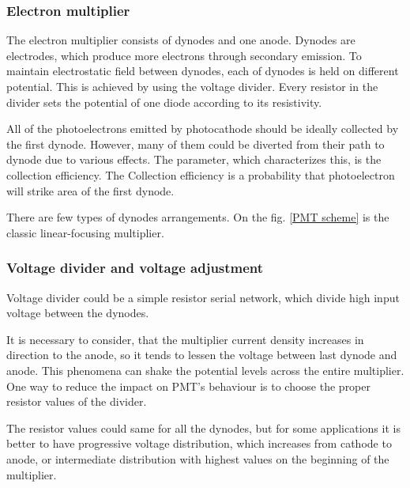 \subsubsection{Electron multiplier}
The electron multiplier consists of dynodes and one anode.
Dynodes are electrodes, which produce more electrons through secondary emission. To maintain electrostatic field between dynodes, each of dynodes is held on different potential. This is achieved by using the voltage divider. Every resistor in the divider sets the potential of one diode according to its resistivity.
\par
All of the photoelectrons emitted by photocathode should be ideally collected by the first dynode. However, many of them could be diverted from their path to dynode due to various effects. The parameter, which characterizes this, is the collection efficiency. The Collection efficiency is a probability that photoelectron will strike area of the first dynode. 
\par
There are few types of dynodes arrangements. On the fig. \ref{PMT scheme} is the classic linear-focusing multiplier. 


\subsubsection{Voltage divider and voltage adjustment}
Voltage divider could be a simple resistor serial network, which divide high input voltage between the dynodes. 
\par
It is necessary to consider, that the multiplier current density increases in direction to the anode, so it tends to lessen the voltage between last dynode and anode. This phenomena can shake the potential levels across the entire multiplier. One way to reduce the impact on PMT's behaviour is to choose the proper resistor values of the divider. 
\par
The resistor values could same for all the dynodes, but for some applications it is better to have progressive voltage distribution, which increases from cathode to anode, or intermediate distribution with highest values on the beginning of the multiplier.

